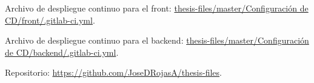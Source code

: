 \newpage
{}\label{appendix:Archivos de configuracion de despliegue continuo}

Archivo de despliegue continuo para el front: \href{https://raw.githubusercontent.com/JoseDRojasA/thesis-files/master/Configuración de CD/front/.gitlab-ci.yml}{thesis-files/master/Configuraci\'on de CD/front/.gitlab-ci.yml}.

\noindent Archivo de despliegue continuo para el backend: \href{https://raw.githubusercontent.com/JoseDRojasA/thesis-files/master/Configuración de CD/backend/.gitlab-ci.yml}{thesis-files/master/Configuraci\'on de CD/backend/.gitlab-ci.yml}.


\noindent Repositorio: \url{https://github.com/JoseDRojasA/thesis-files}.